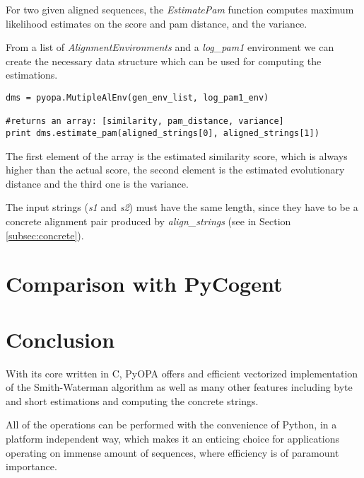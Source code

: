 \documentclass[12pt]{article}
\newcommand{\pp}{PyOPA}
\begin{document}
For two given aligned sequences, the \emph{EstimatePam} function computes maximum likelihood estimates on the score and pam distance, and the variance. 

From a list of \emph{AlignmentEnvironments} and a \emph{log\_pam1} environment we can create the necessary data structure which can be used for computing the estimations.

\begin{lstlisting}
dms = pyopa.MutipleAlEnv(gen_env_list, log_pam1_env)

#returns an array: [similarity, pam_distance, variance]
print dms.estimate_pam(aligned_strings[0], aligned_strings[1])

\end{lstlisting}

The first element of the array is the estimated similarity score, which is always higher than the actual score, the second element is the estimated evolutionary distance and the third one is the variance.

The input strings (\emph{s1} and \emph{s2}) must have the same length, since they have to be a concrete alignment pair produced by \emph{align\_strings} (see in Section \ref{subsec:concrete}).

\section{Comparison with PyCogent}
\label{sec:compCogent}

\section{Conclusion}
\label{sec:concl}

With its core written in C, \pp{} offers and efficient vectorized implementation of the Smith-Waterman algorithm as well as many other features including byte and short estimations and computing the concrete strings.

All of the operations can be performed with the convenience of Python, in a platform independent way, which makes it an enticing choice for applications operating on immense amount of sequences, where efficiency is of paramount importance.
\end{document}
